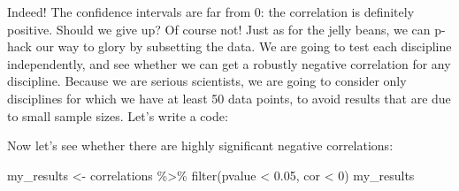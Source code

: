 \documentclass[
  letterpaper,
  DIV=11,
  numbers=noendperiod]{scrreprt}
\newenvironment{Shaded}{\begin{snugshade}}{\end{snugshade}}
\newcommand{\AttributeTok}[1]{\textcolor[rgb]{0.40,0.45,0.13}{#1}}
\newcommand{\DecValTok}[1]{\textcolor[rgb]{0.68,0.00,0.00}{#1}}
\newcommand{\FloatTok}[1]{\textcolor[rgb]{0.68,0.00,0.00}{#1}}
\newcommand{\FunctionTok}[1]{\textcolor[rgb]{0.28,0.35,0.67}{#1}}
\newcommand{\NormalTok}[1]{\textcolor[rgb]{0.00,0.23,0.31}{#1}}
\newcommand{\OtherTok}[1]{\textcolor[rgb]{0.00,0.23,0.31}{#1}}
\newcommand{\SpecialCharTok}[1]{\textcolor[rgb]{0.37,0.37,0.37}{#1}}
\newcommand{\StringTok}[1]{\textcolor[rgb]{0.13,0.47,0.30}{#1}}
\begin{document}
Indeed! The confidence intervals are far from 0: the correlation is
definitely positive. Should we give up? Of course not! Just as for the
jelly beans, we can p-hack our way to glory by subsetting the data. We
are going to test each discipline independently, and see whether we can
get a robustly negative correlation for any discipline. Because we are
serious scientists, we are going to consider only disciplines for which
we have at least 50 data points, to avoid results that are due to small
sample sizes. Let's write a code:

\begin{Shaded}
\end{Shaded}

Now let's see whether there are highly significant negative
correlations:

\begin{Shaded}
\begin{Highlighting}[]
\NormalTok{my\_results }\OtherTok{\textless{}{-}}\NormalTok{ correlations }\SpecialCharTok{\%\textgreater{}\%} \FunctionTok{filter}\NormalTok{(pvalue }\SpecialCharTok{\textless{}} \FloatTok{0.05}\NormalTok{, cor }\SpecialCharTok{\textless{}} \DecValTok{0}\NormalTok{)}
\NormalTok{my\_results}
\end{Highlighting}
\end{Shaded}
\end{document}
